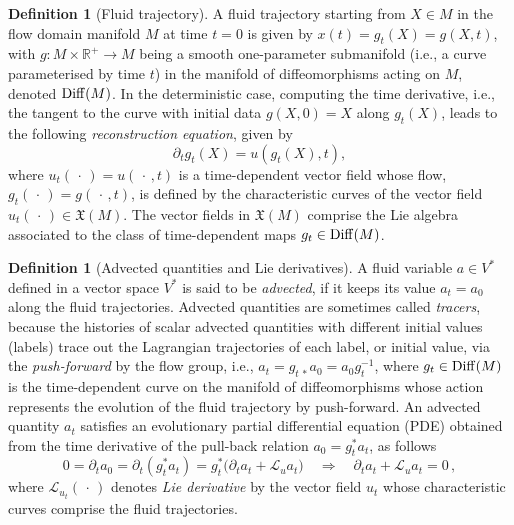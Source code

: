 \documentclass[11pt, oneside]{article}   	%
\numberwithin{equation}{section}
\theoremstyle{plain}
\theoremstyle{definition}
\newtheorem{definition}[theorem]{Definition}
\theoremstyle{remark}
\newcommand{\<}{\langle}
\renewcommand{\>}{\rangle}
\begin{document}
\begin{definition}[Fluid trajectory]
A fluid trajectory starting from $X\in M$ in the flow domain manifold $M$ at time $t=0$ is given by $x(t)=g_t(X)=g(X,t)$, with $g:M\times\mathbb{R}^+\to M$ being a smooth one-parameter submanifold (i.e., a curve parameterised by time $t$) in the manifold of diffeomorphisms acting on $M$, denoted ${\rm Diff}(M)$. In the deterministic case, computing the time derivative, i.e., the tangent to the curve with initial data $g(X,0)=X$ along $g_t(X)$, leads to the following \emph{reconstruction equation}, given by
\begin{equation}
{\partial_t}g_t(X) = u(g_t(X),t),
\label{eq:reconstructiondeterministic}
\end{equation}
where $u_t(\,\cdot\,)=u(\,\cdot\,,t)$ is a time-dependent vector field whose flow, $g_t(\,\cdot\,)=g(\,\cdot\,,t)$, is defined by the characteristic curves of the vector field $u_t(\,\cdot\,)\in \mathfrak{X}(M)$. The vector fields in $\mathfrak{X}(M)$ comprise the Lie algebra associated to the class of time-dependent maps $g_t\in {\rm Diff}(M)$.  
\end{definition}


\begin{definition}[Advected quantities and Lie derivatives]
A fluid variable $a\in V^*$ defined in a vector space $V^*$ is said to be \emph{advected}, if it keeps its value $a_t=a_0$ along the fluid trajectories. Advected quantities are sometimes called \emph{tracers}, because the histories of scalar advected quantities with different initial values (labels) trace out the Lagrangian trajectories of each label, or initial value, via the \emph{push-forward} by the flow group, i.e., $a_t=g_{t\,*}a_0= a_0g_t^{-1}$, where $g_t\in {\rm Diff}(M)$ is the time-dependent curve on the manifold of diffeomorphisms whose action represents the evolution of the fluid trajectory by push-forward. An advected quantity $a_t$ satisfies an evolutionary partial differential equation (PDE) obtained from the time derivative of the pull-back relation $a_0 = g_t^*a_t$, as follows
\[
0 = {\partial_t}a_0 = {\partial_t}(g_t^*a_t )= g_t^*\big({\partial_t}a_t + \mathcal{L}_u a_t\big)
\quad\Longrightarrow\quad {\partial_t}a_t + \mathcal{L}_u a_t = 0 \,,
\]
where $\mathcal{L}_{u_t} (\,\cdot\,)$ denotes \emph{Lie derivative} by the vector field $u_t$ whose characteristic curves comprise the fluid trajectories. 
\end{definition}
\end{document}
